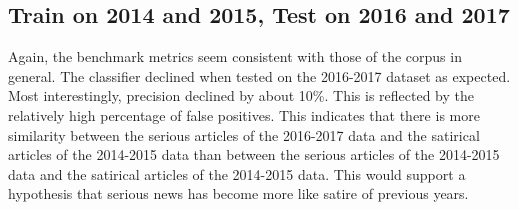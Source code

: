 \documentclass [12 pt] {report}
\begin{document}
\subsection{Train on 2014 and 2015, Test on 2016 and 2017}
\vspace*{-2mm}
\begin{table}[H]
\footnotesize
{}
\label{table:SVM 2014-2015 Train, 2016-2017 Test}
\end{table}
\vspace*{-2mm}
\vspace*{-2mm}
\begin{table}[H]
\small
{}
\label{table:Train 2014-2015, Test 2016-2017 Confusion}
\end{table}
\FloatBarrier

Again, the benchmark metrics seem consistent with those of the corpus in general. The classifier declined when tested on the 2016-2017 dataset as expected. Most interestingly, precision declined by about 10\%. This is reflected by the relatively high percentage of false positives. This indicates that there is more similarity between the serious articles of the 2016-2017 data and the satirical articles of the 2014-2015 data than between the serious articles of the 2014-2015 data and the satirical articles of the 2014-2015 data. This would support a hypothesis that serious news has become more like satire of previous years.
\end{document}
